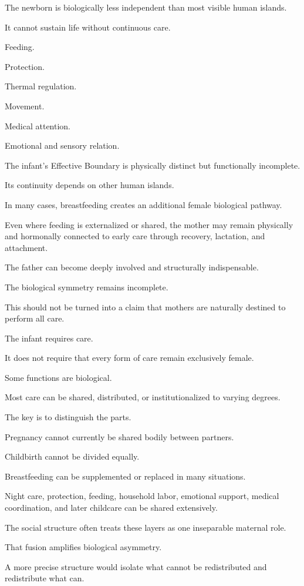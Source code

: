 The newborn is biologically less independent than most visible human islands.

It cannot sustain life without continuous care.

Feeding.

Protection.

Thermal regulation.

Movement.

Medical attention.

Emotional and sensory relation.

The infant’s Effective Boundary is physically distinct but functionally incomplete.

Its continuity depends on other human islands.

In many cases, breastfeeding creates an additional female biological pathway.

Even where feeding is externalized or shared, the mother may remain physically and hormonally connected to early care through recovery, lactation, and attachment.

The father can become deeply involved and structurally indispensable.

The biological symmetry remains incomplete.

This should not be turned into a claim that mothers are naturally destined to perform all care.

The infant requires care.

It does not require that every form of care remain exclusively female.

Some functions are biological.

Most care can be shared, distributed, or institutionalized to varying degrees.

The key is to distinguish the parts.

Pregnancy cannot currently be shared bodily between partners.

Childbirth cannot be divided equally.

Breastfeeding can be supplemented or replaced in many situations.

Night care, protection, feeding, household labor, emotional support, medical coordination, and later childcare can be shared extensively.

The social structure often treats these layers as one inseparable maternal role.

That fusion amplifies biological asymmetry.

A more precise structure would isolate what cannot be redistributed and redistribute what can.

